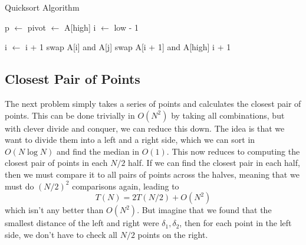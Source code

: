 \documentclass{article}
\begin{document}
    \begin{algo}
      
      \begin{algorithm}[H]
        \caption{Quicksort Algorithm}
        \label{alg:quicksort}
        \begin{algorithmic}
          \State
                  \State p $\gets$  
                  \State {} 
                  \State {} 
              \EndIf
          \EndFunction
          \State
              \State pivot $\gets$ A[high] 
              \State i $\gets$ low - 1 
              
               
                      \State i $\gets$ i + 1 
                      \State swap A[i] and A[j] 
                  \EndIf
              \EndFor
              \State swap A[i + 1] and A[high] 
              \Return i + 1 
          \EndFunction
        \end{algorithmic}
      \end{algorithm}
    \end{algo}

  \subsection{Closest Pair of Points} 

    The next problem simply takes a series of points and calculates the closest pair of points. This can be done trivially in $O(N^2)$ by taking all combinations, but with clever divide and conquer, we can reduce this down. The idea is that we want to divide them into a left and a right side, which we can sort in $O(N \log{N})$ and find the median in $O(1)$. This now reduces to computing the closest pair of points in each $N/2$ half. If we can find the closest pair in each half, then we must compare it to all pairs of points across the halves, meaning that we must do $(N/2)^2$ comparisons again, leading to 
    \begin{equation}
      T(N) = 2 T(N/2) + O(N^2)
    \end{equation}
    which isn't any better than $O(N^2)$. But imagine that we found that the smallest distance of the left and right were $\delta_1, \delta_2$, then for each point in the left side, we don't have to check all $N/2$ points on the right. 
\end{document}
